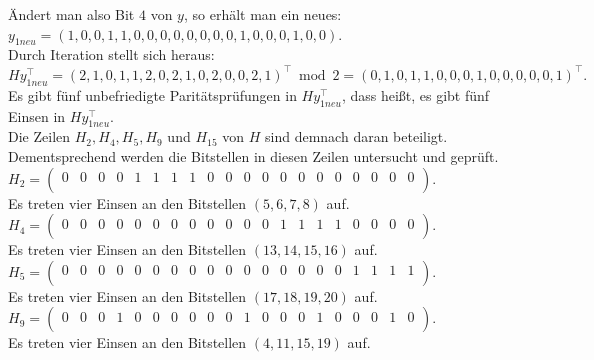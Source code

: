 \begin{Beispiel}
    Ändert man also Bit $4$ von $y$, so erhält man ein neues:\\
    $y_{1neu} = (1,0,0,1,1,0,0,0,0,0,0,0,0,1,0,0,0,1,0,0).$\\
    
    Durch Iteration stellt sich heraus:\\
    $Hy_{1neu}^\intercal= (2,1,0,1,1,2,0,2,1,0,2,0,0,2,1)^\intercal \bmod 2= (0,1,0,1,1,0,0,0,1,0,0,0,0,0,1)^\intercal.$\\
    
    Es gibt fünf unbefriedigte Paritätsprüfungen in $Hy_{1neu}^\intercal$,
    dass hei\ss{}t, es gibt fünf Einsen in $Hy_{1neu}^\intercal.$\\
    Die Zeilen $H_2, H_4, H_5, H_9$ und $H_{15}$ von $H$ sind demnach daran beteiligt.\\
    Dementsprechend werden die Bitstellen in diesen Zeilen untersucht und geprüft.\\
    
    $H_2= \left( \begin{array}{rrrrrrrrrrrrrrrrrrrr}
        0 & 0 & 0 & 0 & 1 & 1 & 1 & 1 & 0 & 0 & 0 & 0 & 0 & 0 & 0 & 0 & 0 & 0 & 0 & 0 \\
       \end{array}\right). 
    $\\
    Es treten vier Einsen an den Bitstellen $(5, 6, 7, 8)$ auf.\\
    
    $H_4= \left( \begin{array}{rrrrrrrrrrrrrrrrrrrr}
        0 & 0 & 0 & 0 & 0 & 0 & 0 & 0 & 0 & 0 & 0 & 0 & 1 & 1 & 1 & 1 & 0 & 0 & 0 & 0 \\
       \end{array}\right). 
    $\\
    Es treten vier Einsen an den Bitstellen $(13, 14, 15, 16)$ auf.\\
    
    $H_5= \left( \begin{array}{rrrrrrrrrrrrrrrrrrrr}
        0 & 0 & 0 & 0 & 0 & 0 & 0 & 0 & 0 & 0 & 0 & 0 & 0 & 0 & 0 & 0 & 1 & 1 & 1 & 1 \\
       \end{array}\right). 
    $\\
    Es treten vier Einsen an den Bitstellen $(17, 18, 19, 20)$ auf.\\
    
    $H_9= \left( \begin{array}{rrrrrrrrrrrrrrrrrrrr}
        0 & 0 & 0 & 1 & 0 & 0 & 0 & 0 & 0 & 0 & 1 & 0 & 0 & 0 & 1 & 0 & 0 & 0 & 1 & 0 \\
       \end{array}\right). 
    $\\
    Es treten vier Einsen an den Bitstellen $(4, 11, 15, 19)$ auf.\\
    

\end{Beispiel}
